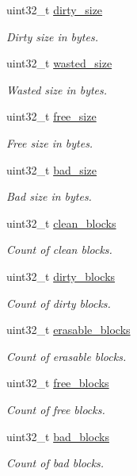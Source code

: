 \begin{DoxyCompactItemize}
uint32\+\_\+t \mbox{\hyperlink{structrtems__jffs2__info_ae569fd3b4994bec143f5b6acb2ed4d91}{dirty\+\_\+size}}
\begin{DoxyCompactList}\small\item\em Dirty size in bytes. \end{DoxyCompactList}\item 
uint32\+\_\+t \mbox{\hyperlink{structrtems__jffs2__info_a97030979e242031081688af9b5c27e0b}{wasted\+\_\+size}}
\begin{DoxyCompactList}\small\item\em Wasted size in bytes. \end{DoxyCompactList}\item 
uint32\+\_\+t \mbox{\hyperlink{structrtems__jffs2__info_ac7751539ad6e314b26eeaf99a0f7b2c5}{free\+\_\+size}}
\begin{DoxyCompactList}\small\item\em Free size in bytes. \end{DoxyCompactList}\item 
uint32\+\_\+t \mbox{\hyperlink{structrtems__jffs2__info_ae9e4525d1c6e9368da1df949dc582873}{bad\+\_\+size}}
\begin{DoxyCompactList}\small\item\em Bad size in bytes. \end{DoxyCompactList}\item 
uint32\+\_\+t \mbox{\hyperlink{structrtems__jffs2__info_a6b2cd9e6f208a127e1d50f5d553ccb9f}{clean\+\_\+blocks}}
\begin{DoxyCompactList}\small\item\em Count of clean blocks. \end{DoxyCompactList}\item 
uint32\+\_\+t \mbox{\hyperlink{structrtems__jffs2__info_a2ec0b2c878734a38faf7ed82c71acaa7}{dirty\+\_\+blocks}}
\begin{DoxyCompactList}\small\item\em Count of dirty blocks. \end{DoxyCompactList}\item 
uint32\+\_\+t \mbox{\hyperlink{structrtems__jffs2__info_abd51db970ab442b56213b910da1fc7e8}{erasable\+\_\+blocks}}
\begin{DoxyCompactList}\small\item\em Count of erasable blocks. \end{DoxyCompactList}\item 
uint32\+\_\+t \mbox{\hyperlink{structrtems__jffs2__info_adff34a170c69d846ec81665d545ead35}{free\+\_\+blocks}}
\begin{DoxyCompactList}\small\item\em Count of free blocks. \end{DoxyCompactList}\item 
uint32\+\_\+t \mbox{\hyperlink{structrtems__jffs2__info_a70de0d41ece7c5ea2b376c7d9ca4023d}{bad\+\_\+blocks}}
\begin{DoxyCompactList}\small\item\em Count of bad blocks. \end{DoxyCompactList}\end{DoxyCompactItemize}


